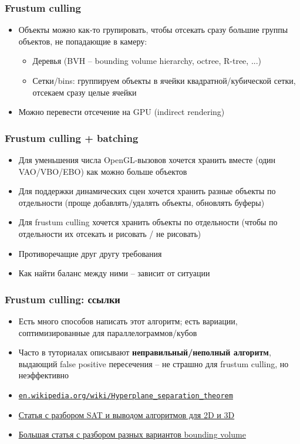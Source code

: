 \documentclass{beamer}
\begin{document}
\begin{frame}[fragile]
\frametitle{Frustum culling}
\begin{itemize}
\item Объекты можно как-то групировать, чтобы отсекать сразу большие группы объектов, не попадающие в камеру:
\pause
\begin{itemize}
\item Деревья (BVH -- bounding volume hierarchy, octree, R-tree, ...)
\pause
\item Сетки/bins: группируем объекты в ячейки квадратной/кубической сетки, отсекаем сразу целые ячейки
\end{itemize}
\pause
\item Можно перевести отсечение на GPU (indirect rendering)
\end{itemize}
\end{frame}

\begin{frame}[fragile]
\frametitle{Frustum culling + batching}
\begin{itemize}
\item Для уменьшения числа OpenGL-вызовов хочется хранить вместе (один VAO/VBO/EBO) как можно больше объектов
\pause
\item Для поддержки динамических сцен хочется хранить разные объекты по отдельности (проще добавлять/удалять объекты, обновлять буферы)
\pause
\item Для frustum culling хочется хранить объекты по отдельности (чтобы по отдельности их отсекать и рисовать / не рисовать)
\pause
\item Противоречащие друг другу требования
\pause
\item Как найти баланс между ними -- зависит от ситуации 
\end{itemize}
\end{frame}

\begin{frame}[fragile]
\frametitle{Frustum culling: ссылки}
\begin{itemize}
\item Есть много способов написать этот алгоритм; есть вариации, соптимизированные для параллелограммов/кубов
\item Часто в туториалах описывают \textbf{неправильный/неполный алгоритм}, выдающий false positive пересечения -- не страшно для frustum culling, но неэффективно
\item \href{https://en.wikipedia.org/wiki/Hyperplane_separation_theorem}{\nolinkurl{en.wikipedia.org/wiki/Hyperplane\_separation\_theorem}}
\item \href{https://www.geometrictools.com/Documentation/MethodOfSeparatingAxes.pdf}{Статья с разбором SAT и выводом алгоритмов для 2D и 3D}
\item \href{https://learnopengl.com/Guest-Articles/2021/Scene/Frustum-Culling}{Большая статья с разбором разных вариантов bounding volume}
\end{itemize}
\end{frame}
\end{document}
